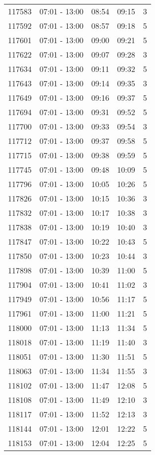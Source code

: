 \documentclass{article}
\begin{document}
\begin{tabular}{llccc}
117583 & 07:01 - 13:00 & 08:54 & 09:15 & 3 \\
117592 & 07:01 - 13:00 & 08:57 & 09:18 & 5 \\
117601 & 07:01 - 13:00 & 09:00 & 09:21 & 5 \\
117622 & 07:01 - 13:00 & 09:07 & 09:28 & 3 \\
117634 & 07:01 - 13:00 & 09:11 & 09:32 & 5 \\
117643 & 07:01 - 13:00 & 09:14 & 09:35 & 3 \\
117649 & 07:01 - 13:00 & 09:16 & 09:37 & 5 \\
117694 & 07:01 - 13:00 & 09:31 & 09:52 & 5 \\
117700 & 07:01 - 13:00 & 09:33 & 09:54 & 3 \\
117712 & 07:01 - 13:00 & 09:37 & 09:58 & 5 \\
117715 & 07:01 - 13:00 & 09:38 & 09:59 & 5 \\
117745 & 07:01 - 13:00 & 09:48 & 10:09 & 5 \\
117796 & 07:01 - 13:00 & 10:05 & 10:26 & 5 \\
117826 & 07:01 - 13:00 & 10:15 & 10:36 & 3 \\
117832 & 07:01 - 13:00 & 10:17 & 10:38 & 3 \\
117838 & 07:01 - 13:00 & 10:19 & 10:40 & 3 \\
117847 & 07:01 - 13:00 & 10:22 & 10:43 & 5 \\
117850 & 07:01 - 13:00 & 10:23 & 10:44 & 3 \\
117898 & 07:01 - 13:00 & 10:39 & 11:00 & 5 \\
117904 & 07:01 - 13:00 & 10:41 & 11:02 & 3 \\
117949 & 07:01 - 13:00 & 10:56 & 11:17 & 5 \\
117961 & 07:01 - 13:00 & 11:00 & 11:21 & 5 \\
118000 & 07:01 - 13:00 & 11:13 & 11:34 & 5 \\
118018 & 07:01 - 13:00 & 11:19 & 11:40 & 3 \\
118051 & 07:01 - 13:00 & 11:30 & 11:51 & 5 \\
118063 & 07:01 - 13:00 & 11:34 & 11:55 & 3 \\
118102 & 07:01 - 13:00 & 11:47 & 12:08 & 5 \\
118108 & 07:01 - 13:00 & 11:49 & 12:10 & 3 \\
118117 & 07:01 - 13:00 & 11:52 & 12:13 & 3 \\
118144 & 07:01 - 13:00 & 12:01 & 12:22 & 5 \\
118153 & 07:01 - 13:00 & 12:04 & 12:25 & 5 \\

\end{tabular}
\end{document}
